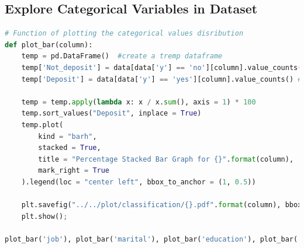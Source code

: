 \documentclass[11pt,a4paper]{article}
\begin{document}
    \subsection{Explore Categorical Variables in Dataset}
\begin{lstlisting}[language = Python]
# Function of plotting the categorical values disribution
def plot_bar(column):
    temp = pd.DataFrame()  #create a tremp dataframe
    temp['Not_deposit'] = data[data['y'] == 'no'][column].value_counts() # count the value when y = no
    temp['Deposit'] = data[data['y'] == 'yes'][column].value_counts() # count the value when y = yes

    temp = temp.apply(lambda x: x / x.sum(), axis = 1) * 100
    temp.sort_values("Deposit", inplace = True)
    temp.plot(
        kind = "barh", 
        stacked = True, 
        title = "Percentage Stacked Bar Graph for {}".format(column), 
        mark_right = True
    ).legend(loc = "center left", bbox_to_anchor = (1, 0.5))

    plt.savefig("../../plot/classification/{}.pdf".format(column), bbox_inches = "tight")
    plt.show();

plot_bar('job'), plot_bar('marital'), plot_bar('education'), plot_bar('contact'), plot_bar('loan'), plot_bar('housing')
\end{lstlisting}
    
\end{document}
